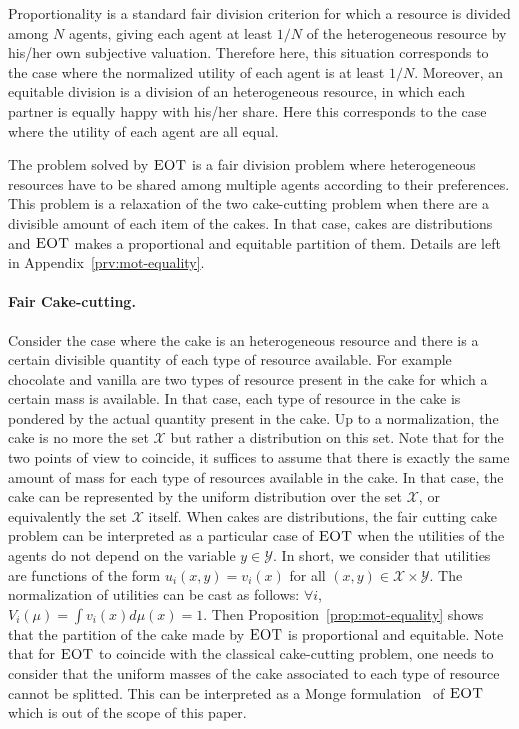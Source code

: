 Proportionality is a standard fair division criterion for which a resource is divided among $N$ agents, giving each agent at least $1/N$ of the heterogeneous resource by his/her own subjective valuation. Therefore here, this situation corresponds to the case where the normalized utility of each agent is at least $1/N$. Moreover, an equitable division is a division of an heterogeneous resource, in which each partner is equally happy with his/her share. Here this corresponds to the case where the utility of each agent are all equal.

The problem solved by $\textsc{EOT}$ is a fair division problem where heterogeneous resources have to be shared among multiple agents according to their preferences. This problem is a relaxation of the two cake-cutting problem when there are a divisible amount of each item of the cakes. In that case, cakes are distributions and $\textsc{EOT}$ makes a proportional and equitable partition of them. Details are left in Appendix~\ref{prv:mot-equality}.

\paragraph{Fair Cake-cutting.} Consider the case where the cake is an heterogeneous resource and there is a certain divisible quantity of each type of resource available. For example chocolate and vanilla are two types of resource present in the cake for which a certain mass is available. In that case, each type of resource in the cake is pondered by the actual quantity present in the cake. Up to a normalization, the cake is no more the set $\mathcal{X}$ but rather a distribution on this set. Note that for the two points of view to coincide, it suffices to assume that there is exactly the same amount of mass for each type of resources available in the cake. In that case, the cake can be represented by the uniform distribution over the set $\mathcal{X}$, or equivalently the set $\mathcal{X}$ itself. When cakes are distributions, the fair cutting cake problem can be interpreted as a particular case of $\textsc{EOT}$ when the utilities of the agents do not depend on the variable $y\in\mathcal{Y}$. In short, we consider that utilities are functions of the form $u_i(x,y)=v_i(x)$ for all $(x,y)\in\mathcal{X}\times\mathcal{Y}$. The normalization of utilities can be cast as follows: $\forall i$, $V_i(\mu) = \int v_i(x) d\mu(x) = 1$. Then Proposition~\ref{prop:mot-equality} shows that the partition of the cake made by $\textsc{EOT}$ is proportional and equitable. Note that for $\textsc{EOT}$ to coincide with the classical cake-cutting problem, one needs to consider that the uniform masses of the cake associated to each type of resource cannot be splitted. This can be interpreted as a Monge formulation~\citep{villani2003topics} of $\textsc{EOT}$ which is out of the scope of this paper. 


